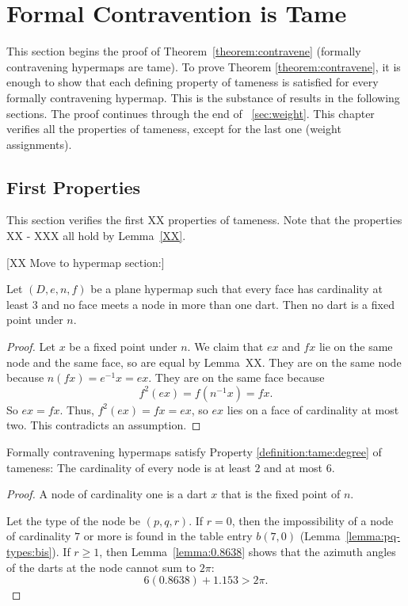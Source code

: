 \chapter{Formal Contravention is Tame}
    \label{sec:contraproof}

This section begins the proof of Theorem~\ref{theorem:contravene}
(formally contravening hypermaps are tame). To prove Theorem
\ref{theorem:contravene}, it is enough to show that each defining
property of tameness is satisfied for every formally contravening
hypermap. This is the substance of results in the following
sections. The proof continues through the end of
\Chap~\ref{sec:weight}. This chapter verifies all the properties of
tameness, except for the last one (weight assignments).

\section{First Properties}

This section verifies the first XX properties of tameness.  Note
that the properties XX - XXX all hold by Lemma~\ref{XX}.

[XX Move to hypermap section:]

\begin{lemma} Let $(D,e,n,f)$ be a plane hypermap such that every face has
cardinality at least $3$ and no face meets a node in more than one
dart.  Then no dart is a fixed point under $n$.
\end{lemma}

\begin{proof}  Let $x$ be a fixed point under
$n$. We claim that $e x$ and $f x$ lie on the same node and the same
face, so are equal by Lemma~XX.  They are on the same node because
$n(f x) = e^{-1} x = e x$. They are on the same face because
    $$f^2 (e x) =  f(n^{-1} x) = f x.$$
So $e x = f x$.   Thus, $f^2 (e x) = f x = e x$, so $e x$ lies on a
face of cardinality at most two.  This contradicts an assumption.
\end{proof}


\begin{lemma} Formally contravening hypermaps satisfy Property
\ref{definition:tame:degree} of tameness: The cardinality of every
node is at least $2$ and at most $6$.
\end{lemma}

\begin{proof}  A node of cardinality one is a dart
$x$ that is the fixed point of $n$.

Let the type of the node be $(p,q,r)$.  If $r=0$, then the
impossibility of a node of cardinality $7$ or more is found in the
table entry $b(7,0)$ (Lemma~\ref{lemma:pq-types:bis}). If $r\ge1$,
then Lemma~\ref{lemma:0.8638} shows that the azimuth angles of the
darts at the node cannot sum to $2\pi$:
    $$6 (0.8638) + 1.153 > 2\pi.$$
\end{proof}



